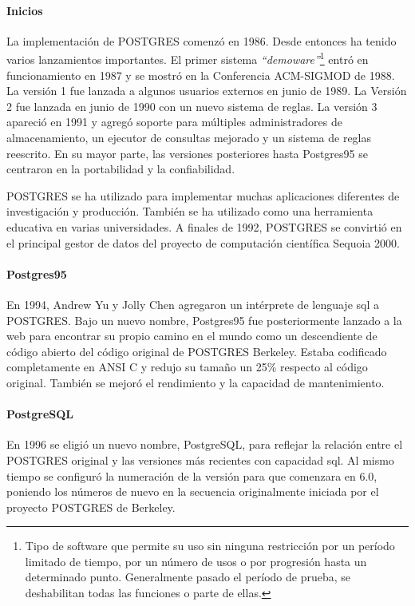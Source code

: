\paragraph{Inicios}
La implementación de POSTGRES comenzó en 1986. Desde entonces ha tenido varios lanzamientos importantes. El primer sistema \emph{``demoware''}\footnote{Tipo de software que permite su uso sin ninguna restricción por un período limitado de tiempo, por un número de usos o por progresión hasta un determinado punto. Generalmente pasado el período de prueba, se deshabilitan todas las funciones o parte de ellas.} entró en funcionamiento en 1987 y se mostró en la Conferencia ACM-SIGMOD de 1988. La versión 1 fue lanzada a algunos usuarios externos en junio de 1989. La Versión 2 fue lanzada en junio de 1990 con un nuevo sistema de reglas. La versión 3 apareció en 1991 y agregó soporte para múltiples administradores de almacenamiento, un ejecutor de consultas mejorado y un sistema de reglas reescrito. En su mayor parte, las versiones posteriores hasta Postgres95 se centraron en la portabilidad y la confiabilidad.

POSTGRES se ha utilizado para implementar muchas aplicaciones diferentes de investigación y producción. También se ha utilizado como una herramienta educativa en varias universidades. A finales de 1992, POSTGRES se convirtió en el principal gestor de datos del proyecto de computación científica Sequoia 2000.

\paragraph{Postgres95}
En 1994, Andrew Yu y Jolly Chen agregaron un intérprete de lenguaje \acrshort{sql} a POSTGRES. Bajo un nuevo nombre, Postgres95 fue posteriormente lanzado a la web para encontrar su propio camino en el mundo como un descendiente de código abierto del código original de POSTGRES Berkeley. Estaba codificado completamente en ANSI C y redujo su tamaño un 25\% respecto al código original. También se mejoró el rendimiento y la capacidad de mantenimiento.

\paragraph{PostgreSQL}
En 1996 se eligió un nuevo nombre, PostgreSQL, para reflejar la relación entre el POSTGRES original y las versiones más recientes con capacidad \acrshort{sql}. Al mismo tiempo se configuró la numeración de la versión para que comenzara en 6.0, poniendo los números de nuevo en la secuencia originalmente iniciada por el proyecto POSTGRES de Berkeley.

